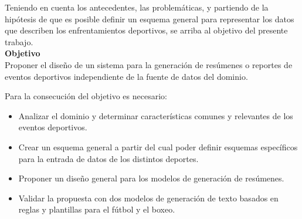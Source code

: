 

Teniendo en cuenta los antecedentes, las problemáticas, y partiendo de la hipótesis de que es posible definir un esquema general para representar los 
datos que describen los enfrentamientos deportivos, se arriba al objetivo del presente trabajo.\\



    \textbf{Objetivo}\\

    Proponer el diseño de un sistema para la generación de res\'umenes o reportes de eventos deportivos 
independiente de la fuente de datos del dominio.


    Para la consecución del objetivo es necesario:

    \begin{itemize}
        \item Analizar el dominio y determinar características comunes y relevantes de los eventos deportivos.
        \item Crear un esquema general a partir del cual poder definir esquemas específicos para la entrada de datos de los distintos deportes.
        \item Proponer un diseño general para los modelos de generación de resúmenes.
        \item Validar la propuesta con dos modelos de generación de texto basados en reglas y plantillas para el fútbol y el boxeo.   
    \end{itemize}

